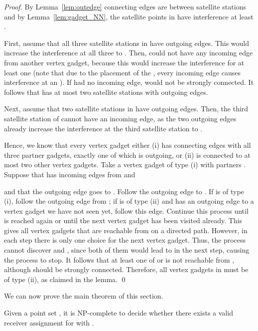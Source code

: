 \documentclass[envcountsect,envcountsame,runningheads,a4paper]{llncs}
\begin{document}
\begin{proof}
By Lemma~\ref{lem:outedge} connecting edges are between satellite stations and
by Lemma~\ref{lem:gadget_NN},
the satellite points  in  have
interference at least .

First, assume that all three satellite
stations in  have outgoing edges.
This would increase the interference
at all three  to . Then,  could
not have any incoming edge from another vertex gadget,
because this would increase the interference for
at least one  (note that due to the placement of
the , every incoming edge causes interference at
an ). If  had no incoming edge,  would
not be strongly connected.
It follows that   has at most two satellite stations
with outgoing edges.

Next, assume that two satellite stations in
 have outgoing edges. Then, the third satellite station
of  cannot have an incoming edge,
as the two outgoing edges already increase the interference at the
third satellite station to .

Hence, we know that every vertex gadget  either
(i) has connecting edges with all three partner
gadgets, exactly one of which is outgoing,
or  (ii) is connected to
at most two other vertex gadgets. Take a vertex gadget  of type (i)
with partners .
Suppose that  has incoming edges from  and

and that the outgoing edge goes to . Follow the outgoing edge to
. If  is of type (i), follow the outgoing
edge from ; if  is of type (ii) and has an
outgoing edge to a vertex gadget we have not seen yet, follow this edge.
Continue this process until  is reached again or until
the next vertex gadget has been visited already. This gives
all vertex gadgets that are reachable from  on a
directed path.
However, in each step there is only one choice for the next
vertex gadget. Thus,
the process cannot discover  and , since both of them
would lead to  in the next step, causing the process to stop.
It follows that at least one of  or
 is not reachable from , although
 should be strongly connected. Therefore, all vertex gadgets in
 must be of type (ii), as claimed in the lemma.
\qed{}
\end{proof}


\noindent
We can now prove the main theorem of this section.

\begin{theorem}\label{thm:asym_NPC}
Given a point set , it is
\textup{NP}-complete to decide whether
there exists a valid receiver assignment  for
 with .
\end{theorem}
\end{document}
